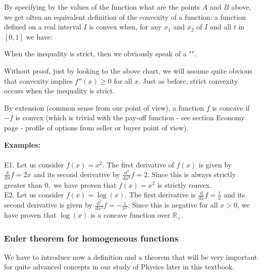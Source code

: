 	By specifying by the values of the function what are the points $A$ and $B$ above, we get often an equivalent definition of the convexity of a function: a function defined on a real interval $I$ is convex when, for any $x_1$ and $x_2$ of $I$ and all $t$ in $[0,1]$ we have:
	
	When the inequality is strict, then we obviously speak of a "".
	
	\begin{tcolorbox}[title=Remark,arc=10pt,breakable,drop lifted shadow,
  skin=enhanced,
  skin first is subskin of={enhancedfirst}{arc=10pt,no shadow},
  skin middle is subskin of={enhancedmiddle}{arc=10pt,no shadow},
  skin last is subskin of={enhancedlast}{drop lifted shadow}]
	Without proof, just by looking to the above chart, we will assume quite obvious that convexity implies $f''(x)\geq 0$ for all $x$. Just as before, strict convexity occurs when the inequality is strict.
	\end{tcolorbox}

	By extension (common sense from our point of view), a function $f$ is concave if $-f$ is convex (which is trivial with the pay-off function - see section Economy page \pageref{finance convex function} - profile of options from seller or buyer point of view).
	
	\begin{tcolorbox}[colframe=black,colback=white,sharp corners]
	\textbf{{\Large {}}Examples:}\\\\
	E1. Let us consider $f(x)=x^{2}$. The first derivative of $f(x)$ is given by $\frac{\mathrm{d}}{\mathrm{d} x} f=2 x$ and its second derivative by $\frac{\mathrm{d}^{2}}{\mathrm{d} x^{2}} f=2$. Since this is always strictly greater than $0,$ we have proven that $f(x)=x^{2}$ is strictly convex.\\
	
	E2. Let us consider $f(x)=\log (x)$. The first derivative is $\frac{\mathrm{d}}{\mathrm{d} x} f=\frac{1}{x}$ and its second derivative is given by $\frac{\mathrm{d}^{2}}{\mathrm{d} x^{2}} f=-\frac{1}{x^{2}}$. Since this is negative for all $x>0$, we have proven that $\log(x)$ is a concave function over $\mathbb{R}_{+}$.
	\end{tcolorbox}
	
	\subsubsection{Euler theorem for homogeneous functions}
	We have to introduce now a definition and a theorem that will be very important for quite advanced concepts in our study of Physics later in this textbook.
		
